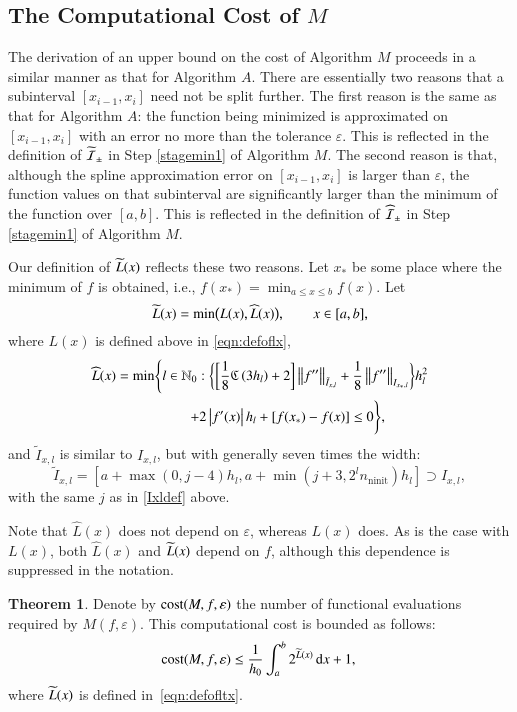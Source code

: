\documentclass[review]{elsarticle}
\newcommand{\abstol}{\varepsilon}
\theoremstyle{definition}
\newcommand{\Ixl}{I_{x,l}}
\newcommand{\chL}{\widehat{L}}
\DeclareMathOperator{\ninit}{ninit}
\newtheorem{theorem}{Theorem}
\begin{document}
\subsection{The Computational Cost of $M$} \label{subsec:optcost}
The derivation of an upper bound on the cost of Algorithm $M$ proceeds in a
similar manner as that for Algorithm $A$. There are essentially two reasons that a
subinterval $[x_{i-1},x_i]$ need not be split further. The first reason is the same as that
for Algorithm $A$: the function being minimized is approximated on
$[x_{i-1},x_i]$ with an error no more than the tolerance $\abstol$. This is
reflected in the definition of $\widetilde{\mathcal{I}}_{\pm}$ in Step \ref{stagemin1} of Algorithm
$M$.  The second
reason is that, although the spline approximation error on $[x_{i-1},x_i]$ is larger
than $\abstol$, the function values on that subinterval are significantly larger
than the minimum of the function over $[a,b]$.  This is reflected in the definition of
$\widehat{\mathcal{I}}_{\pm}$ in Step \ref{stagemin1} of Algorithm $M$.

Our definition of $\widetilde{L}(x)$ reflects these two reasons. Let $x_*$ be some place
where the minimum of $f$ is obtained, i.e.,
$f(x_*)  = \min_{a \le x \le b} f(x).$
Let
\begin{equation}\label{eqn:defofltx}
\tL(x) = \min\bigl(L(x),\chL(x)\bigr), \qquad x \in [a,b],
\end{equation}
where $L(x)$ is defined above in \eqref{eqn:defoflx},
\begin{multline}\label{eqn:defoflt1x}
\chL(x) = \min \Biggl\{ l \in \mathbb{N}_0 :  \biggl\{ \biggl[\frac 18 \fC\left(3h_l\right) + 2
\biggr]   \norm[\tilde{I}_{x,l}]{f''} + \frac18\norm[{I_{x_*,l}}]{f''} \biggr\} h_{l}^2 \\ \qquad
\qquad +  2 \abs{f'(x)} h_{l} + [f(x_*) - f(x)] \le 0 \Biggr\},
\end{multline}
and $\tilde{I}_{x,l}$ is similar to $\Ixl$, but with generally seven times the width:
\begin{equation*}
\tilde{I}_{x,l}=\left[a+\max(0,j-4)h_l, a+ \min(j+3,2^l n_{\ninit})h_l\right] \supset \Ixl,
\end{equation*}
with the same $j$ as in \eqref{Ixldef} above.


Note that $\chL(x)$ does not depend on $\abstol$, whereas $L(x)$ does. As is the
case with $L(x)$, both $\chL(x)$ and $\widetilde{L}(x)$ depend on $f$, although this
dependence is suppressed in the notation.

\begin{theorem}\label{thm:Mcost}
	Denote by $\cost(M,f,\abstol)$ the number of functional evaluations required by
	$M(f,\abstol)$. This computational cost is bounded as follows:
	\begin{equation*}
	\cost(M,f,\abstol) \le \frac{1}{h_0}\int_a^b 2^{\tL(x)} \, \dif x +1, \\
	\end{equation*}
	where $\widetilde{L}(x)$ is defined in~\eqref{eqn:defofltx}.
\end{theorem}
\end{document}
